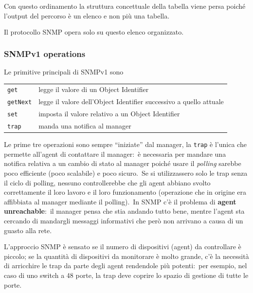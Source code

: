 \noindent Con questo ordinamento la struttura concettuale della tabella viene persa poiché l'output del percorso è un elenco e non più una tabella.\

Il protocollo SNMP opera solo su questo elenco organizzato.

\subsubsection{SNMPv1 operations}

Le primitive principali di SNMPv1 sono
\begin{table}[H]
    \centering
    \begin{tabular}{l l}
        \texttt{get}     & legge il valore di un Object Identifier                            \\
        \texttt{getNext} & legge il valore dell'Object Identifier successivo a quello attuale \\
        \texttt{set}     & imposta il valore relativo a un Object Identifier                  \\
        \texttt{trap}    & manda una notifica al manager                                      \\
    \end{tabular}
\end{table}

\noindent Le prime tre operazioni sono sempre ``iniziate'' dal manager, la \texttt{trap} è l'unica che permette all'agent di contattare il manager:\ è necessaria per mandare una notifica relativa a un cambio di stato al manager poiché usare il \textit{polling} sarebbe poco efficiente (poco scalabile) e poco sicuro.\
Se si utilizzassero solo le trap senza il ciclo di polling, nessuno controllerebbe che gli agent abbiano svolto correttamente il loro lavoro e il loro funzionamento (operazione che in origine era affibbiata al manager mediante il polling).\
In SNMP c'è il problema di \textbf{agent unreachable}:\ il manager pensa che stia andando tutto bene, mentre l'agent sta cercando di mandargli messaggi informativi che però non arrivano a causa di un guasto alla rete.\

L'approccio SNMP è sensato se il numero di dispositivi (agent) da controllare è piccolo; se la quantità di dispositivi da monitorare è molto grande, c'è la necessità di arricchire le trap da parte degli agent rendendole più potenti:\ per esempio, nel caso di uno switch a 48 porte, la trap deve coprire lo spazio di gestione di tutte le porte.\

